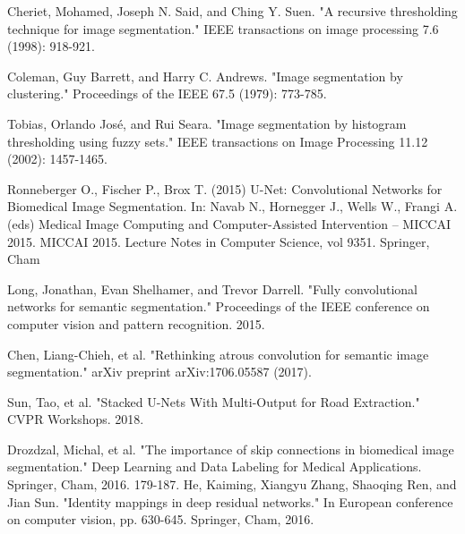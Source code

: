 \documentclass[10pt,journal,compsoc]{IEEEtran}
\begin{document}
\begin{thebibliography}{99}

Cheriet, Mohamed, Joseph N. Said, and Ching Y. Suen. "A recursive thresholding technique for image segmentation." IEEE transactions on image processing 7.6 (1998): 918-921.

Coleman, Guy Barrett, and Harry C. Andrews. "Image segmentation by clustering." Proceedings of the IEEE 67.5 (1979): 773-785.

Tobias, Orlando José, and Rui Seara. "Image segmentation by histogram thresholding using fuzzy sets." IEEE transactions on Image Processing 11.12 (2002): 1457-1465.


Ronneberger O., Fischer P., Brox T. (2015) U-Net: Convolutional Networks for Biomedical Image Segmentation. In: Navab N., Hornegger J., Wells W., Frangi A. (eds) Medical Image Computing and Computer-Assisted Intervention – MICCAI 2015. MICCAI 2015. Lecture Notes in Computer Science, vol 9351. Springer, Cham

Long, Jonathan, Evan Shelhamer, and Trevor Darrell. "Fully convolutional networks for semantic segmentation." Proceedings of the IEEE conference on computer vision and pattern recognition. 2015.

Chen, Liang-Chieh, et al. "Rethinking atrous convolution for semantic image segmentation." arXiv preprint arXiv:1706.05587 (2017).

Sun, Tao, et al. "Stacked U-Nets With Multi-Output for Road Extraction." CVPR Workshops. 2018.

Drozdzal, Michal, et al. "The importance of skip connections in biomedical image segmentation." Deep Learning and Data Labeling for Medical Applications. Springer, Cham, 2016. 179-187.
He, Kaiming, Xiangyu Zhang, Shaoqing Ren, and Jian Sun. "Identity mappings in deep residual networks." In European conference on computer vision, pp. 630-645. Springer, Cham, 2016.
\end{thebibliography}

% 
\end{document}
